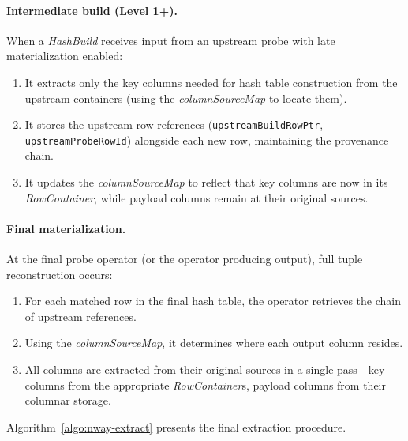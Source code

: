 \paragraph{Intermediate build (Level 1+).}
When a \emph{HashBuild} receives input from an upstream probe with late materialization enabled:
\begin{enumerate}[leftmargin=*]
  \item It extracts only the key columns needed for hash table construction from the upstream containers (using the \emph{columnSourceMap} to locate them).
  \item It stores the upstream row references (\texttt{upstreamBuildRowPtr}, \texttt{upstreamProbeRowId}) alongside each new row, maintaining the provenance chain.
  \item It updates the \emph{columnSourceMap} to reflect that key columns are now in its \emph{RowContainer}, while payload columns remain at their original sources.
\end{enumerate}

\paragraph{Final materialization.}
At the final probe operator (or the operator producing output), full tuple reconstruction occurs:
\begin{enumerate}[leftmargin=*]
  \item For each matched row in the final hash table, the operator retrieves the chain of upstream references.
  \item Using the \emph{columnSourceMap}, it determines where each output column resides.
  \item All columns are extracted from their original sources in a single pass—key columns from the appropriate \emph{RowContainer}s, payload columns from their columnar storage.
\end{enumerate}

Algorithm~\ref{algo:nway-extract} presents the final extraction procedure.


